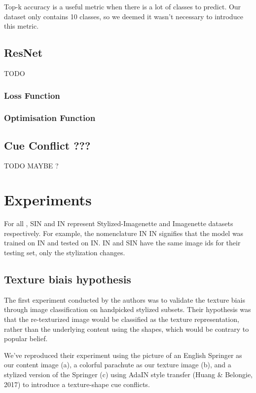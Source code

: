 \documentclass{article}
\begin{document}
Top-k accuracy is a useful metric when there is a lot of classes to predict. Our dataset only
contains 10 classes, so we deemed it wasn't necessary to introduce this metric.

\subsection{ResNet}

TODO

\subsubsection{Loss Function}

\subsubsection{Optimisation Function}


\subsection{Cue Conflict ???}

TODO MAYBE ?

\newpage
\section{Experiments}

For all , SIN and IN represent Stylized-Imagenette and Imagenette datasets respectively.
For example, the nomenclature IN \texorpdfstring{\textrightarrow} .IN signifies that the 
model was trained on IN and tested on IN.
IN and SIN have the same image ids for their testing set, only the stylization changes.

\subsection{Texture biais hypothesis}

The first experiment conducted by the authors was to validate the texture biais 
through image classification on handpicked stylized subsets. 
Their hypothesis was that the re-texturized image would be classified as the texture representation, rather than 
the underlying content using the shapes, which would be contrary to popular belief. \smallskip

\noindent
We've reproduced their experiment using the picture of an English Springer as our content image (a), 
a colorful parachute as our texture image (b),
and a stylized version of the Springer (c) using AdaIN style transfer 
(Huang \& Belongie, 2017) %
to introduce a texture-shape cue conflicts. \smallskip
\end{document}
